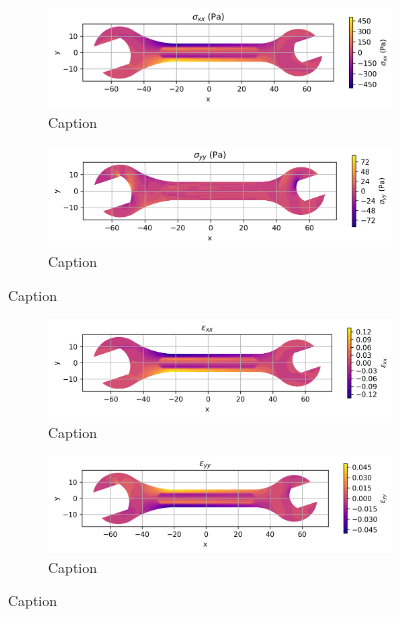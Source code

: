 \begin{figure}[H]
  \centering
  \begin{subfigure}[t]{0.49\textwidth}
    \centering
    \includegraphics[width=\textwidth]{GRAFICOS/Case a - sigma_xx.png}
    \caption{Caption}
    \label{fig:deformada_reacciones}
  \end{subfigure}
  \hfill
  \begin{subfigure}[t]{0.49\textwidth}
    \centering
    \includegraphics[width=\textwidth]{GRAFICOS/Case a - sigma_yy.png}
    \caption{Caption}
    \label{fig:von_mises}
  \end{subfigure}
  \caption{Caption}
  \label{fig:analisis_estructural}
\end{figure}

\begin{figure}[H]
  \centering
  \begin{subfigure}[t]{0.49\textwidth}
    \centering
    \includegraphics[width=\textwidth]{GRAFICOS/Case a - epsilon_xx.png}
    \caption{Caption}
    \label{fig:deformada_reacciones}
  \end{subfigure}
  \hfill
  \begin{subfigure}[t]{0.49\textwidth}
    \centering
    \includegraphics[width=\textwidth]{GRAFICOS/Case a - epsilon_yy.png}
    \caption{Caption}
    \label{fig:von_mises}
  \end{subfigure}
  \caption{Caption}
  \label{fig:analisis_estructural}
\end{figure}

